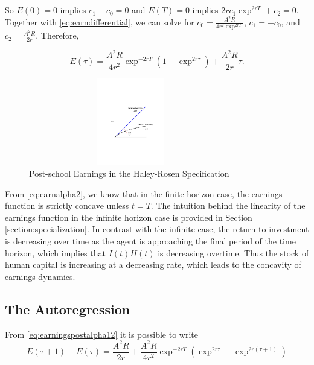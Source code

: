 \indent So $E(0)=0$ implies $c_{1} + c_{0} = 0$ and $\dot{E(T)} = 0$ implies $2rc_1 \exp^{2rT}  + c_{2} = 0$. Together with \eqref{eq:earndifferential}, we can solve for $c_0 = \frac{A^2 R}{4r^2 \exp^{2rT}}$, $c_1 = -c_0$, and $c_2 = \frac{A^2 R}{2r}$. Therefore, 

\begin{equation}
E(\tau) = \frac{A^2 R}{4r^2} \exp^{-2r T} \left( 1 - \exp^{2r \tau} \right) + \frac{A^2 R}{2r} \tau. \label{eq:earningspostalpha12}
\end{equation}

\begin{center}
\begin{figure}[H]
\caption{Post-school Earnings in the Haley-Rosen Specification}
\centering
\includegraphics[width=3.5in, height=1.5in]{Figures/fig-finite-horiz.pdf}
\end{figure}
\end{center}

\indent From \eqref{eq:earnalpha2}, we know that in the finite horizon case, the earnings function is strictly concave unless $t=T$. The intuition behind the linearity of the earnings function in the infinite horizon case is provided in Section \ref{section:specialization}. In contrast with the infinite case, the return to investment is decreasing over time as the agent is approaching the final period of the time horizon, which implies that $I(t)H(t)$ is decreasing overtime. Thus the stock of human capital is increasing at a decreasing rate, which leads to the concavity of earnings dynamics. 

\subsection{The Autoregression}
From \eqref{eq:earningspostalpha12} it is possible to write
\begin{equation}
E(\tau + 1) - E(\tau) =  \frac{A^2 R}{2r}+ \frac{A^2 R}{4r^2} \exp^{-2rT} \left( \exp^{2r\tau} - \exp^{2r(\tau+1)} \right) 
\end{equation}

